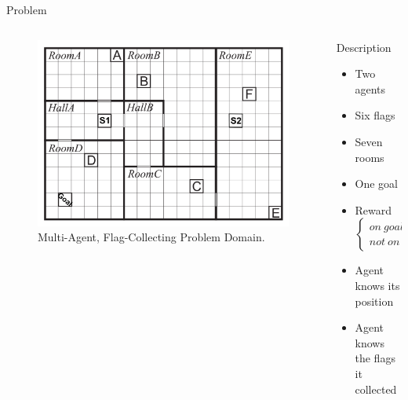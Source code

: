 \documentclass{bredelebeamer}
\begin{document}
\begin{frame}{Problem}

\begin{columns}[t]
\begin{column}{0.5\linewidth}
\begin{figure}[h!]
\centering
  \includegraphics[width=\linewidth]{../article/img/stydyCase.png}
  \caption{Multi-Agent, Flag-Collecting Problem Domain.}
  \label{fig:studycase1}
\end{figure}
\end{column}

\begin{column}{0.5\linewidth}
\begin{block}{Description}
\begin{itemize}
\item Two agents
\item Six flags
\item Seven rooms
\item One goal
\item Reward  $\left\{
\begin{array}{l}
on\ goal =  Flags*100 \\
not\ on\ goal = 0
\end{array}
\right.$
\item Agent knows its position
\item Agent knows the flags it collected
\end{itemize}


\end{block}
\end{column}

\end{columns}

\end{frame}
\end{document}
